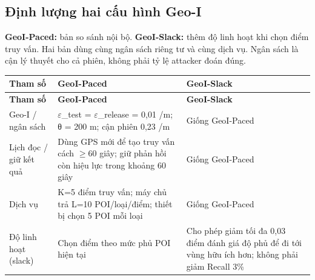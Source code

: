 \subsection{Định lượng hai cấu hình Geo-I}
\textbf{GeoI-Paced:} bản so sánh nội bộ. \textbf{GeoI-Slack:} thêm độ linh hoạt khi chọn điểm truy vấn. Hai bản dùng cùng ngân sách riêng tư và cùng dịch vụ. Ngân sách là cận lý thuyết cho cả phiên, không phải tỷ lệ attacker đoán đúng.

\begingroup\small
\begin{longtable}{@{}P{3.938cm}P{6.350cm}P{6.350cm}@{}}
\toprule
\textbf{Tham số} & \textbf{GeoI-Paced} & \textbf{GeoI-Slack}\\\midrule
\endfirsthead
\toprule
\textbf{Tham số} & \textbf{GeoI-Paced} & \textbf{GeoI-Slack}\\\midrule
\endhead
\bottomrule\endfoot
Geo-I / ngân sách & $\varepsilon$\_\allowbreak{}test = $\varepsilon$\_\allowbreak{}release = 0,01 /m; θ = 200 m; cận phiên 0,23 /m & Giống GeoI-Paced\\
\addlinespace[3pt]
Lịch đọc / giữ kết quả & Dùng GPS mới để tạo truy vấn cách $\ge$60 giây; giữ phản hồi còn hiệu lực trong khoảng 60 giây & Giống GeoI-Paced\\
\addlinespace[3pt]
Dịch vụ & K=5 điểm truy vấn; máy chủ trả L=10 POI/loại/điểm; thiết bị chọn 5 POI mỗi loại & Giống GeoI-Paced\\
\addlinespace[3pt]
Độ linh hoạt (slack) & Chọn điểm theo mức phủ POI hiện tại & Cho phép giảm tối đa 0,03 điểm đánh giá độ phủ để đi tới vùng hữu ích hơn; không phải giảm Recall 3\%\\
\end{longtable}
\endgroup
{}

